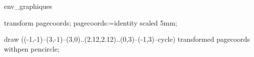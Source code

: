 \startenvironment env_graphiques

  \def\mycolor{.625red}

  transform pagecoords;
  pagecoords:=identity scaled 5mm;
  
  draw
    ((-1,-1)--(3,-1)--(3,0)..(2.12,2.12)..(0,3)--(-1,3)--cycle)
    transformed pagecoords withpen pencircle;
  \stopuseMPgraphic

\stopenvironment
